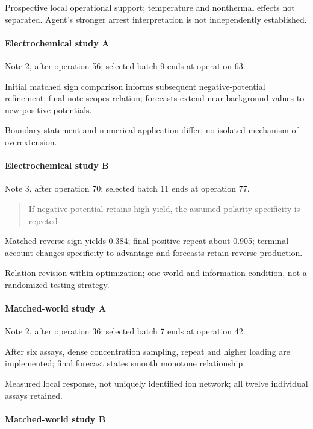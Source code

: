 \documentclass[10pt,a4paper]{article}
\begin{document}
Prospective local operational support; temperature and nonthermal effects not separated. Agent's stronger arrest interpretation is not independently established.

\paragraph{Electrochemical study A}\label{electrochemical-study-a}

Note 2, after operation 56; selected batch 9 ends at operation 63.

Initial matched sign comparison informs subsequent negative-potential refinement; final note scopes relation; forecasts extend near-background values to new positive potentials.

Boundary statement and numerical application differ; no isolated mechanism of overextension.

\paragraph{Electrochemical study B}\label{electrochemical-study-b}

Note 3, after operation 70; selected batch 11 ends at operation 77.

\begin{quote}
If negative potential retains high yield, the assumed polarity specificity is rejected
\end{quote}

Matched reverse sign yields 0.384; final positive repeat about 0.905; terminal account changes specificity to advantage and forecasts retain reverse production.

Relation revision within optimization; one world and information condition, not a randomized testing strategy.

\paragraph{Matched-world study A}\label{matched-world-study-a}

Note 2, after operation 36; selected batch 7 ends at operation 42.

After six assays, dense concentration sampling, repeat and higher loading are implemented; final forecast states smooth monotone relationship.

Measured local response, not uniquely identified ion network; all twelve individual assays retained.

\paragraph{Matched-world study B}\label{matched-world-study-b}
\end{document}
